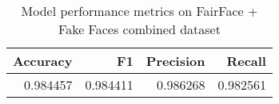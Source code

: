 \begin{table}
\centering
\caption{Model performance metrics on FairFace + Fake Faces combined dataset}
\label{vgg10-combined-metrics}
\begin{tabular}{rrrr}
\toprule
 Accuracy &        F1 &  Precision &    Recall \\
\midrule
 0.984457 &  0.984411 &   0.986268 &  0.982561 \\
\bottomrule
\end{tabular}
\end{table}

